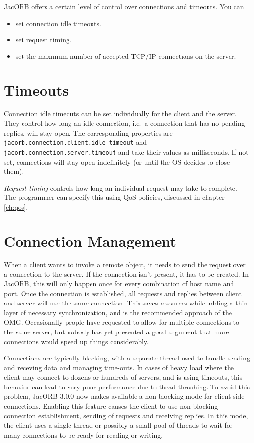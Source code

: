 
JacORB offers a certain level of control over connections and timeouts. You
can
\begin{itemize}
\item set connection idle timeouts.
\item set request timing.
\item set the maximum number of accepted TCP/IP connections on the server.
\end{itemize}

\section{Timeouts}
\label{connection_timeouts}
Connection idle timeouts can be set individually for the client and the
server. They control how long an idle connection, i.e.~a connection that has
no pending replies, will stay open. The corresponding properties are {\tt
  jacorb.connection.client.idle\_timeout} and {\tt
  jacorb.connection.server.timeout} and take their values as milliseconds. If
not set, connections will stay open indefinitely (or until the OS decides to
close them).

\emph{Request timing} controls how long an individual request may take to
complete.  The programmer can specify this using QoS policies,
discussed in chapter \ref{ch:qos}.

\section{Connection Management}
\label{connection_management}

When a client wants to invoke a remote object, it needs to send the request
over a connection to the server. If the connection isn't present, it has to be
created. In JacORB, this will only happen once for every combination of host
name and port. Once the connection is established, all requests and replies
between client and server will use the same connection. This saves resources
while adding a thin layer of necessary synchronization, and is the recommended
approach of the OMG. Occasionally people have requested to allow for multiple
connections to the same server, but nobody has yet presented a good argument
that more connections would speed up things considerably.

Connections are typically blocking, with a separate thread used to handle
sending and receving data and managing time-outs. In cases of heavy load
where the client may connect to dozens or hundreds of servers, and is using
timeouts, this behavior can lead to very poor performance due to thead
thrashing. To avoid this problem, JacORB 3.0.0 now makes available a non\-
blocking mode for client side connections. Enabling this feature causes the
client to use non-blocking connection establishment, sending of requests and
receiving replies. In this mode, the client uses a single thread or possibly a
small pool of threads to wait for many connections to be ready for reading
or writing. 

